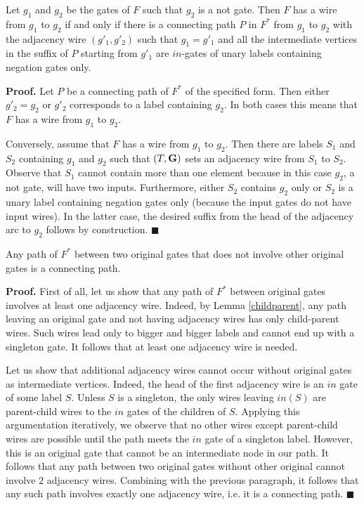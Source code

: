 \documentclass{llncs}
\begin{document}
\begin{lemma} \label{notconnect}
Let $g_1$ and $g_2$ be the gates of $F$ such that $g_2$ is a {\sc not} gate. Then $F$ has a wire from $g_1$ to $g_2$ if and only if 
there is a connecting path $P$ in $F^*$ from $g_1$ to $g_2$ with the adjacency wire $(g'_1,g'_2)$ such that $g_1=g'_1$ and all the intermediate vertices in the suffix of $P$ 
starting from $g'_1$ are $in$-gates of unary labels containing negation gates only.
\end{lemma}

{\bf Proof.}
Let $P$ be a connecting path of $F^*$ of the specified form. Then either $g'_2=g_2$ or $g'_2$ corresponds to a label containing $g_2$. In both cases this means that $F$ has a wire from $g_1$ to $g_2$.

Conversely, assume that $F$ has a wire from $g_1$ to $g_2$.
Then there are labels $S_1$ and $S_2$ containing $g_1$ and $g_2$ such that $(T,{\bf G})$ sets an adjacency wire from $S_1$ to $S_2$. Observe that $S_1$ cannot contain more than one element because in this case $g_2$, a {\sc not} gate, will have two inputs. Furthermore, either $S_2$ contains $g_2$ only or $S_2$ is a unary label containing negation gates only
(because the input gates do not have input wires). In the latter case, the desired suffix from the head of the adjacency arc to $g_2$ follows by construction.  
$\blacksquare$

\begin{lemma} \label{ubconnect}
Any path of $F^*$ between two original gates that does not involve other original gates is a connecting path.
\end{lemma}

{\bf Proof.}
First of all, let us show that any path of $F^*$ between original gates involves at least one adjacency wire. 
Indeed, by Lemma \ref{childparent}, any path leaving an original gate and not having adjacency wires has only child-parent wires.
Such wires lead only to bigger and bigger labels and cannot end up with a singleton gate.
It follows that at least one adjacency wire is needed.

Let us show that additional adjacency wires cannot occur without original gates as intermediate vertices.
Indeed, the head of the first adjacency wire is an $in$ gate of some label $S$. Unless $S$ is a singleton,
the only wires leaving $in(S)$ are parent-child wires to the $in$ gates of the children of $S$. Applying this
argumentation iteratively, we observe that no other wires except parent-child wires are possible until
the path meets the $in$ gate of a singleton label. However, this is an original gate that cannot be 
an intermediate node in our path. It follows that any path between two original gates without other original 
cannot involve $2$ adjacency wires. Combining with the previous paragraph, it follows that any such path
involves exactly one adjacency wire, i.e. it is a connecting path.
$\blacksquare$ 
\end{document}
